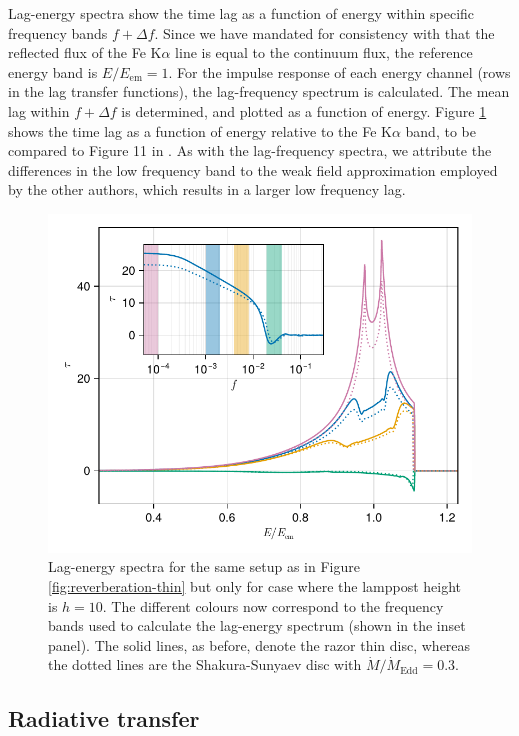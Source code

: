 \documentclass[fleqn,usenatbib]{mnras}
\newcommand{\FeKa}{Fe K$\alpha$ }
\begin{document}
Lag-energy spectra show the time lag as a function of energy within specific frequency bands $f + \Delta
f$. Since we have mandated for consistency with \cite{cackett_modelling_2014}
that the reflected flux of the \FeKa line is equal to the continuum flux,
the reference energy band is $E/E_\text{em} = 1$.  For the impulse response of
each energy channel (rows in the lag transfer functions), the lag-frequency
spectrum is calculated. The mean lag within $f + \Delta f$ is determined, and
plotted as a function of energy. Figure \ref{fig:lag-energy} shows
the time lag as a function of energy relative to the \FeKa band,
to be compared to Figure 11 in \cite{cackett_modelling_2014}. As with the
lag-frequency spectra, we attribute the differences in the low frequency band to
the weak field approximation employed by the other authors, which results in a
larger low frequency lag.

\begin{figure}
    \centering
    \includegraphics[width=0.98\linewidth]{figures/reverberation.lag-energy.pdf}
    \caption{Lag-energy spectra for the same setup as in Figure
    \ref{fig:reverberation-thin} but only for case where the lamppost height is
$h=10$. The different colours now correspond to the frequency bands used to
calculate the lag-energy spectrum (shown in the inset panel). The solid lines,
as before, denote the razor thin disc, whereas the dotted lines are the
Shakura-Sunyaev disc with $\dot{M} / \dot{M}_\text{Edd} =0.3$.}
    \label{fig:lag-energy}
\end{figure}


\subsection{Radiative transfer}
\end{document}
